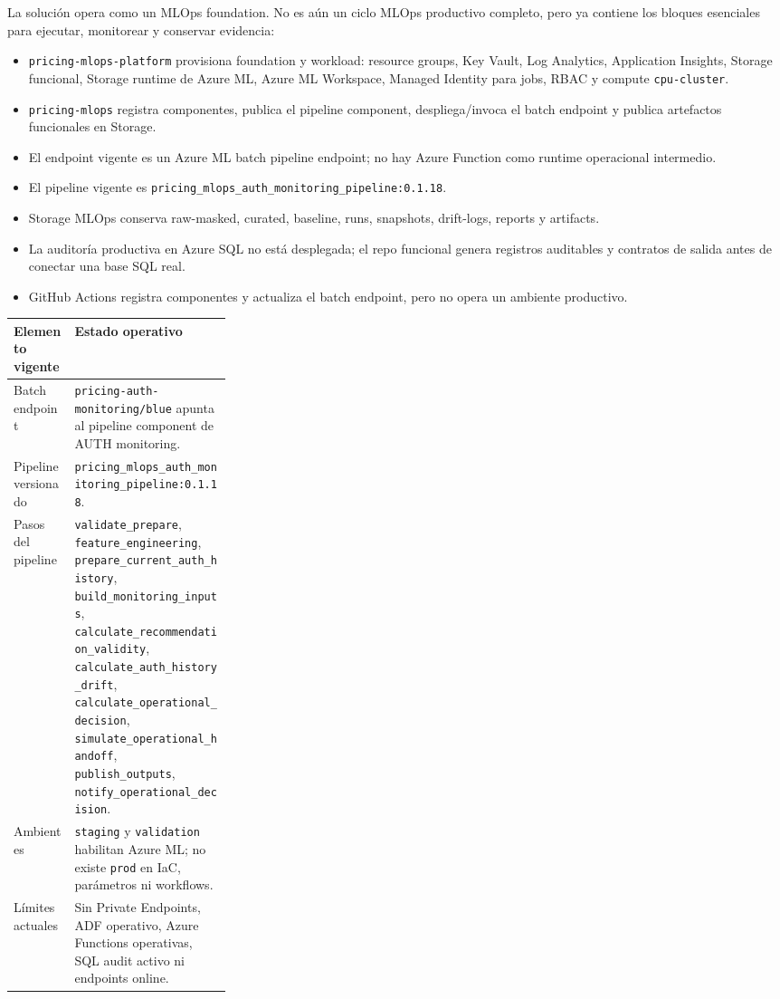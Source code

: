 \documentclass[11pt,letterpaper]{article}
\begin{document}
La solución opera como un MLOps foundation. No es aún un ciclo MLOps productivo completo, pero ya contiene los bloques esenciales para ejecutar, monitorear y conservar evidencia:

\begin{itemize}
  \item \texttt{pricing-mlops-platform} provisiona foundation y workload: resource groups, Key Vault, Log Analytics, Application Insights, Storage funcional, Storage runtime de Azure ML, Azure ML Workspace, Managed Identity para jobs, RBAC y compute \texttt{cpu-cluster}.
  \item \texttt{pricing-mlops} registra componentes, publica el pipeline component, despliega/invoca el batch endpoint y publica artefactos funcionales en Storage.
  \item El endpoint vigente es un Azure ML batch pipeline endpoint; no hay Azure Function como runtime operacional intermedio.
  \item El pipeline vigente es \texttt{pricing\_mlops\_auth\_monitoring\_pipeline:0.1.18}.
  \item Storage MLOps conserva raw-masked, curated, baseline, runs, snapshots, drift-logs, reports y artifacts.
  \item La auditoría productiva en Azure SQL no está desplegada; el repo funcional genera registros auditables y contratos de salida antes de conectar una base SQL real.
  \item GitHub Actions registra componentes y actualiza el batch endpoint, pero no opera un ambiente productivo.
\end{itemize}

\begin{tabularx}{\linewidth}{L{0.28\linewidth}Y}
\toprule
\textbf{Elemento vigente} & \textbf{Estado operativo} \\
\midrule
Batch endpoint & \texttt{pricing-auth-monitoring/blue} apunta al pipeline component de AUTH monitoring. \\
Pipeline versionado & \texttt{pricing\_mlops\_auth\_monitoring\_pipeline:0.1.18}. \\
Pasos del pipeline & \texttt{validate\_prepare}, \texttt{feature\_engineering}, \texttt{prepare\_current\_auth\_history}, \texttt{build\_monitoring\_inputs}, \texttt{calculate\_recommendation\_validity}, \texttt{calculate\_auth\_history\_drift}, \texttt{calculate\_operational\_decision}, \texttt{simulate\_operational\_handoff}, \texttt{publish\_outputs}, \texttt{notify\_operational\_decision}. \\
Ambientes & \texttt{staging} y \texttt{validation} habilitan Azure ML; no existe \texttt{prod} en IaC, parámetros ni workflows. \\
Límites actuales & Sin Private Endpoints, ADF operativo, Azure Functions operativas, SQL audit activo ni endpoints online. \\
\bottomrule
\end{tabularx}
\end{document}
